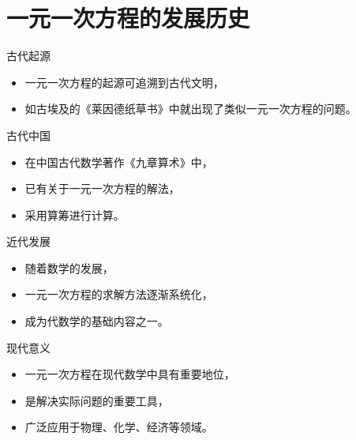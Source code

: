 \documentclass{ctexbeamer}
\begin{document}
\section{一元一次方程的发展历史}

\begin{frame}{古代起源}
  \begin{itemize}
    \item 一元一次方程的起源可追溯到古代文明，
    \item 如古埃及的《莱因德纸草书》中就出现了类似一元一次方程的问题。
  \end{itemize}
\end{frame}

\begin{frame}{古代中国}
  \begin{itemize}
    \item 在中国古代数学著作《九章算术》中，
    \item 已有关于一元一次方程的解法，
    \item 采用算筹进行计算。
  \end{itemize}
\end{frame}

\begin{frame}{近代发展}
  \begin{itemize}
    \item 随着数学的发展，
    \item 一元一次方程的求解方法逐渐系统化，
    \item 成为代数学的基础内容之一。
  \end{itemize}
\end{frame}

\begin{frame}{现代意义}
  \begin{itemize}
    \item 一元一次方程在现代数学中具有重要地位，
    \item 是解决实际问题的重要工具，
    \item 广泛应用于物理、化学、经济等领域。
  \end{itemize}
\end{frame}
\end{document}
